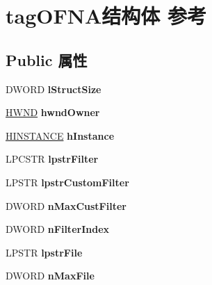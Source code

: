 \hypertarget{structtag_o_f_n_a}{}\section{tag\+O\+F\+N\+A结构体 参考}
\label{structtag_o_f_n_a}
\subsection*{Public 属性}
\begin{DoxyCompactItemize}
\item 
\mbox{\label{structtag_o_f_n_a_acf6c514cc8759cfa502f0e6f59f77555}} 
D\+W\+O\+RD {\bfseries l\+Struct\+Size}
\item 
\mbox{\label{structtag_o_f_n_a_a78d69464d2eb011433c19a847d5fa9ee}} 
\hyperlink{interfacevoid}{H\+W\+ND} {\bfseries hwnd\+Owner}
\item 
\mbox{\label{structtag_o_f_n_a_aae3f3bbb09fdfef8bc6c5fbb2a316b3c}} 
\hyperlink{interfacevoid}{H\+I\+N\+S\+T\+A\+N\+CE} {\bfseries h\+Instance}
\item 
\mbox{\label{structtag_o_f_n_a_aeb8e4a994f771a2e026cff0519708b64}} 
L\+P\+C\+S\+TR {\bfseries lpstr\+Filter}
\item 
\mbox{\label{structtag_o_f_n_a_a760ea8efd7c40182509fc459b5017906}} 
L\+P\+S\+TR {\bfseries lpstr\+Custom\+Filter}
\item 
\mbox{\label{structtag_o_f_n_a_a4ed1afdfc55a08cc6314c0ee0eccef9a}} 
D\+W\+O\+RD {\bfseries n\+Max\+Cust\+Filter}
\item 
\mbox{\label{structtag_o_f_n_a_a784fb93eab755a3300104489007b9750}} 
D\+W\+O\+RD {\bfseries n\+Filter\+Index}
\item 
\mbox{\label{structtag_o_f_n_a_ab02d8cbe65f6fd9bb9d3d5b94f532b5b}} 
L\+P\+S\+TR {\bfseries lpstr\+File}
\item 
\mbox{\label{structtag_o_f_n_a_afd18c621889a2ae6d06aa9c06d5a063f}} 
D\+W\+O\+RD {\bfseries n\+Max\+File}
\item 

\end{DoxyCompactItemize}

